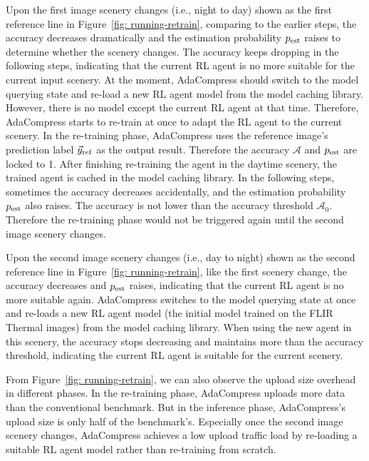 Upon the first image scenery changes (i.e., night to day) shown as the first reference line in Figure~\ref{fig: running-retrain}, comparing to the earlier steps, the accuracy decreases dramatically and the estimation probability $ p_{\rm est} $ raises to determine whether the scenery changes. The accuracy keeps dropping in the following steps, indicating that the current RL agent is no more suitable for the current input scenery. At the moment, AdaCompress should switch to the model querying state and re-load a new RL agent model from the model caching library. However, there is no model except the current RL agent at that time. Therefore, AdaCompress starts to re-train at once to adapt the RL agent to the current scenery. In the re-training phase, AdaCompress uses the reference image's prediction label $ \vec{y}_{\rm ref} $ as the output result. Therefore the accuracy $ \mathcal{A} $ and $ p_{\rm est} $ are locked to 1. After finishing re-training the agent in the daytime scenery, the trained agent is cached in the model caching library. In the following steps, sometimes the accuracy decreases accidentally, and the estimation probability $ p_{\rm est} $ also raises. The accuracy is not lower than the accuracy threshold $ \mathcal{A}_0 $. Therefore the re-training phase would not be triggered again until the second image scenery changes. %

Upon the second image scenery changes (i.e., day to night) shown as the second reference line in Figure~\ref{fig: running-retrain}, like the first scenery change, the accuracy decreases and $ p_{\rm est} $ raises, indicating that the current RL agent is no more suitable again. AdaCompress switches to the model querying state at once and re-loads a new RL agent model (the initial model trained on the FLIR Thermal images) from the model caching library. When using the new agent in this scenery, the accuracy stops decreasing and maintains more than the accuracy threshold, indicating the current RL agent is suitable for the current scenery.  %

From Figure~\ref{fig: running-retrain}, we can also observe the upload size overhead in different phases. In the re-training phase, AdaCompress uploads more data than the conventional benchmark. But in the inference phase, AdaCompress's upload size is only half of the benchmark's. Especially once the second image scenery changes, AdaCompress achieves a low upload traffic load by re-loading a suitable RL agent model rather than re-training from scratch. %


